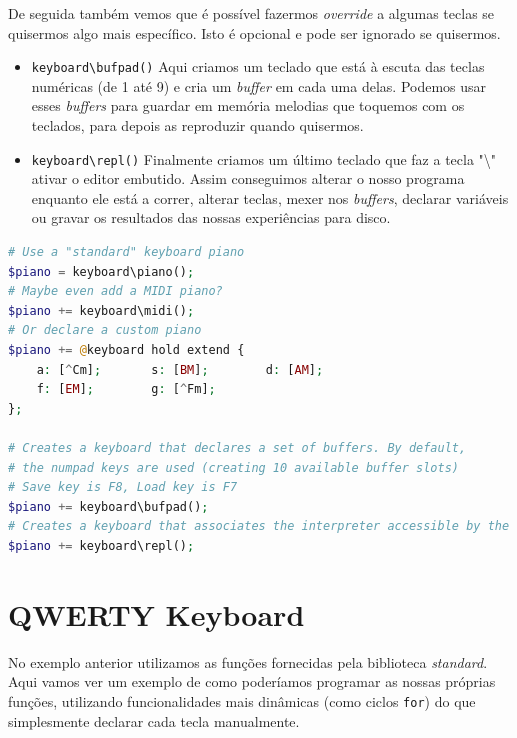  De seguida também vemos que é possível fazermos \textit{override} a algumas teclas se quisermos algo mais específico. Isto é opcional e pode ser ignorado se quisermos.
 
 \begin{itemize}
  \item \texttt{keyboard\textbackslash{}bufpad()} Aqui criamos um teclado que está à escuta das teclas numéricas (de 1 até 9) e cria um \textit{buffer} em cada uma delas. Podemos usar esses \textit{buffers} para guardar em memória melodias que toquemos com os teclados, para depois as reproduzir quando quisermos.
 \item \texttt{keyboard\textbackslash{}repl()} Finalmente criamos um último teclado que faz a tecla "\textbackslash{}" ativar o editor embutido. Assim conseguimos alterar o nosso programa enquanto ele está a correr, alterar teclas, mexer nos \textit{buffers}, declarar variáveis ou gravar os resultados das nossas experiências para disco.
\end{itemize}


\begin{lstlisting}[caption=Junção de vários teclados criados usando funções da biblioteca standard,language=PHP]
# Use a "standard" keyboard piano
$piano = keyboard\piano();
# Maybe even add a MIDI piano?
$piano += keyboard\midi();
# Or declare a custom piano
$piano += @keyboard hold extend {
    a: [^Cm];       s: [BM];        d: [AM];
    f: [EM];        g: [^Fm];       
};

# Creates a keyboard that declares a set of buffers. By default, 
# the numpad keys are used (creating 10 available buffer slots)
# Save key is F8, Load key is F7
$piano += keyboard\bufpad();
# Creates a keyboard that associates the interpreter accessible by the "\" key
$piano += keyboard\repl();
\end{lstlisting}

\section{QWERTY Keyboard}
No exemplo anterior utilizamos as funções fornecidas pela biblioteca \textit{standard}. Aqui vamos ver um exemplo de como poderíamos programar as nossas próprias funções, utilizando funcionalidades mais dinâmicas (como ciclos \texttt{for}) do que simplesmente declarar cada tecla manualmente.

